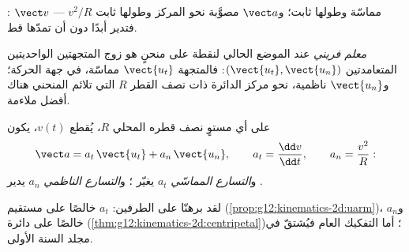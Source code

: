 \begin{omfigure}

{\small {}: $\vect v$ مماسّة وطولها ثابت؛
و$\vect a$ مصوَّبة نحو المركز وطولها ثابت $v^2/R$ --- فتدير
 أبدًا دون أن تمدّها قط.}
\end{omfigure}

\begin{definition}\label{def:g12:kinematics-2d:frenet}
\emph{معلم فريني} عند الموضع الحالي
لنقطة على  منحنٍ هو زوج المتجهتين الواحديتين
المتعامدتين $(\vect{u_t}, \vect{u_n})$: فالمتجهة $\vect{u_t}$ مماسّة، في جهة
الحركة؛ و$\vect{u_n}$ ناظمية، نحو مركز الدائرة ذات
نصف القطر $R$ التي تلائم المنحني هناك أفضل ملاءمة.
\end{definition}

\begin{proposition}\label{prop:g12:kinematics-2d:frenetacc}
على أي  مستوٍ نصف قطره المحلي $R$، يُقطع  $v(t)$، يكون
\[
\vect a = a_t\,\vect{u_t} + a_n\,\vect{u_n},
\qquad a_t = \frac{\dd v}{\dd t},
\qquad a_n = \frac{v^2}{R}:
\]
و\emph{التسارع المماسّي}
$a_t$ يغيّر ؛ و\emph{التسارع
الناظمي} $a_n$ يدير .
\end{proposition}
\admitted

\begin{remark}\label{rem:g12:kinematics-2d:frenetproof}
لقد برهنّا على الطرفين: $a_t$ خالصًا على مستقيم
(\cref{prop:g12:kinematics-2d:uarm})، و$a_n$ خالصًا على دائرة
(\cref{thm:g12:kinematics-2d:centripetal})؛ أما التفكيك
العام فيُشتقّ في مجلد السنة الأولى.
\end{remark}

